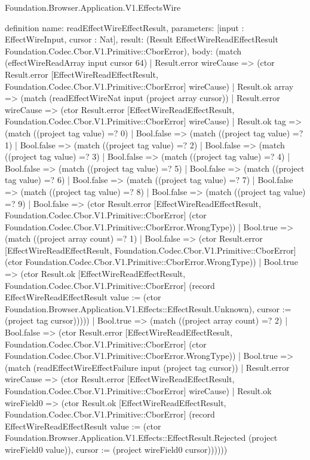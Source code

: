 \begin{lexlean}{Foundation.Browser.Application.V1.EffectsWire}
\begin{semanticmodule}
definition{
  name: readEffectWireEffectResult,
  parameters: [input : EffectWireInput, cursor : Nat],
  result: (Result EffectWireReadEffectResult Foundation.Codec.Cbor.V1.Primitive::CborError),
  body: (match (effectWireReadArray input cursor 64)
    | Result.error wireCause => (ctor Result.error [EffectWireReadEffectResult, Foundation.Codec.Cbor.V1.Primitive::CborError] wireCause)
    | Result.ok array => (match (readEffectWireNat input (project array cursor))
      | Result.error wireCause => (ctor Result.error [EffectWireReadEffectResult, Foundation.Codec.Cbor.V1.Primitive::CborError] wireCause)
      | Result.ok tag => (match ((project tag value) =? 0)
        | Bool.false => (match ((project tag value) =? 1)
          | Bool.false => (match ((project tag value) =? 2)
            | Bool.false => (match ((project tag value) =? 3)
              | Bool.false => (match ((project tag value) =? 4)
                | Bool.false => (match ((project tag value) =? 5)
                  | Bool.false => (match ((project tag value) =? 6)
                    | Bool.false => (match ((project tag value) =? 7)
                      | Bool.false => (match ((project tag value) =? 8)
                        | Bool.false => (match ((project tag value) =? 9)
                          | Bool.false => (ctor Result.error [EffectWireReadEffectResult, Foundation.Codec.Cbor.V1.Primitive::CborError] (ctor Foundation.Codec.Cbor.V1.Primitive::CborError.WrongType))
                          | Bool.true => (match ((project array count) =? 1)
                            | Bool.false => (ctor Result.error [EffectWireReadEffectResult, Foundation.Codec.Cbor.V1.Primitive::CborError] (ctor Foundation.Codec.Cbor.V1.Primitive::CborError.WrongType))
                            | Bool.true => (ctor Result.ok [EffectWireReadEffectResult, Foundation.Codec.Cbor.V1.Primitive::CborError] (record EffectWireReadEffectResult {value := (ctor Foundation.Browser.Application.V1.Effects::EffectResult.Unknown), cursor := (project tag cursor)}))))
                        | Bool.true => (match ((project array count) =? 2)
                          | Bool.false => (ctor Result.error [EffectWireReadEffectResult, Foundation.Codec.Cbor.V1.Primitive::CborError] (ctor Foundation.Codec.Cbor.V1.Primitive::CborError.WrongType))
                          | Bool.true => (match (readEffectWireEffectFailure input (project tag cursor))
                            | Result.error wireCause => (ctor Result.error [EffectWireReadEffectResult, Foundation.Codec.Cbor.V1.Primitive::CborError] wireCause)
                            | Result.ok wireField0 => (ctor Result.ok [EffectWireReadEffectResult, Foundation.Codec.Cbor.V1.Primitive::CborError] (record EffectWireReadEffectResult {value := (ctor Foundation.Browser.Application.V1.Effects::EffectResult.Rejected (project wireField0 value)), cursor := (project wireField0 cursor)})))))
}
\end{semanticmodule}
\end{lexlean}
